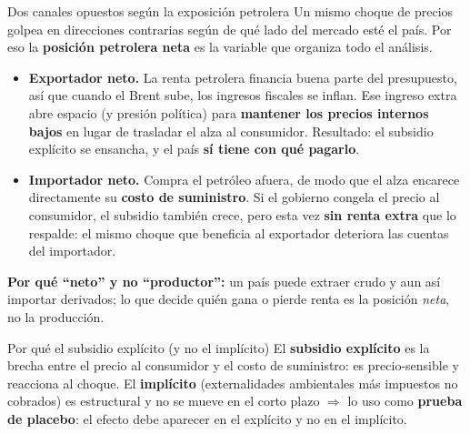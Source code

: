 \documentclass[aspectratio=169,10pt]{beamer}
\newcommand{\key}[1]{{\bfseries\color{AcentoRojo}#1}}
\begin{document}
\begin{frame}{Dos canales opuestos según la exposición petrolera}
  \small
  Un mismo choque de precios golpea en direcciones contrarias según de qué lado del mercado
  esté el país. Por eso la \textbf{posición petrolera neta} es la variable que organiza todo
  el análisis.
  \begin{itemize}
    \item \textbf{Exportador neto.} La renta petrolera financia buena parte del presupuesto, así
          que cuando el Brent sube, los ingresos fiscales se inflan. Ese ingreso extra abre
          espacio (y presión política) para \textbf{mantener los precios internos bajos} en
          lugar de trasladar el alza al consumidor. Resultado: el subsidio explícito se ensancha,
          y el país \textbf{sí tiene con qué pagarlo}.
    \item \textbf{Importador neto.} Compra el petróleo afuera, de modo que el alza encarece
          directamente su \textbf{costo de suministro}. Si el gobierno congela el precio al
          consumidor, el subsidio también crece, pero esta vez \textbf{sin renta extra} que lo
          respalde: el mismo choque que beneficia al exportador deteriora las cuentas del importador.
  \end{itemize}
  \textbf{Por qué ``neto'' y no ``productor'':} un país puede extraer crudo y aun así importar
  derivados; lo que decide quién gana o pierde renta es la posición \emph{neta}, no la producción.

  \begin{block}{Por qué el subsidio explícito (y no el implícito)}
    El \key{subsidio explícito} es la brecha entre el precio al consumidor y el costo de
    suministro: es precio-sensible y reacciona al choque. El \textbf{implícito} (externalidades
    ambientales más impuestos no cobrados) es estructural y no se mueve en el corto plazo
    $\Rightarrow$ lo uso como \textbf{prueba de placebo}: el efecto debe aparecer en el explícito
    y no en el implícito.
  \end{block}

\end{frame}
\end{document}
